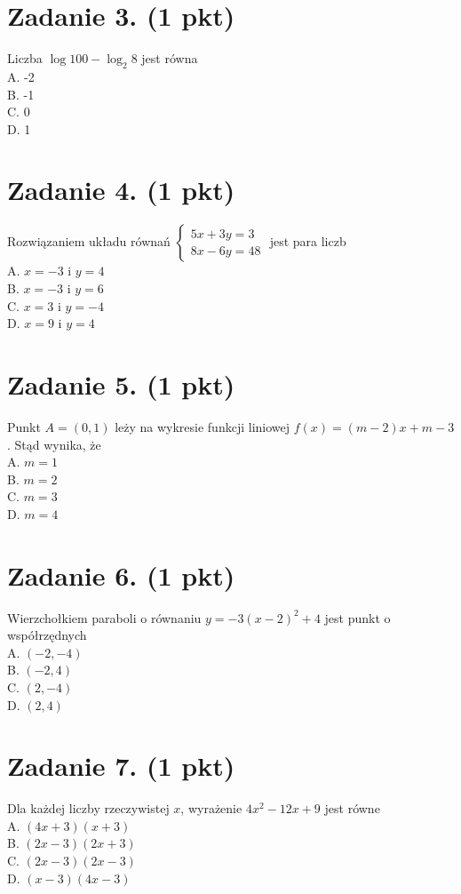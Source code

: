 \documentclass[10pt]{article}
\begin{document}
\section*{Zadanie 3. (1 pkt)}
Liczba \(\log 100-\log _{2} 8\) jest równa\\
A. -2\\
B. -1\\
C. 0\\
D. 1

\section*{Zadanie 4. (1 pkt)}
Rozwiązaniem układu równań \(\left\{\begin{array}{l}5 x+3 y=3 \\ 8 x-6 y=48\end{array}\right.\) jest para liczb\\
A. \(x=-3\) i \(y=4\)\\
B. \(x=-3\) i \(y=6\)\\
C. \(x=3\) i \(y=-4\)\\
D. \(x=9\) i \(y=4\)

\section*{Zadanie 5. (1 pkt)}
Punkt \(A=(0,1)\) leży na wykresie funkcji liniowej \(f(x)=(m-2) x+m-3\). Stąd wynika, że\\
A. \(m=1\)\\
B. \(m=2\)\\
C. \(m=3\)\\
D. \(m=4\)

\section*{Zadanie 6. (1 pkt)}
Wierzchołkiem paraboli o równaniu \(y=-3(x-2)^{2}+4\) jest punkt o współrzędnych\\
A. \((-2,-4)\)\\
B. \((-2,4)\)\\
C. \((2,-4)\)\\
D. \((2,4)\)

\section*{Zadanie 7. (1 pkt)}
Dla każdej liczby rzeczywistej \(x\), wyrażenie \(4 x^{2}-12 x+9\) jest równe\\
A. \((4 x+3)(x+3)\)\\
B. \((2 x-3)(2 x+3)\)\\
C. \((2 x-3)(2 x-3)\)\\
D. \((x-3)(4 x-3)\)
\end{document}
